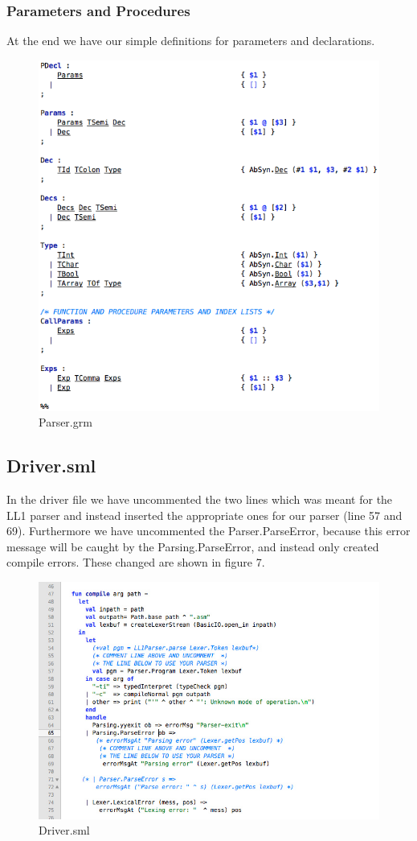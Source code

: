 \documentclass[12pt,a4paper,english]{article}
\begin{document}
\subsubsection{Parameters and Procedures}
At the end we have our simple definitions for parameters and declarations.
\begin{figure}[h]\includegraphics[width=15cm]{params.png}\caption{Parser.grm}\end{figure}

\newpage
\subsection{Driver.sml}
In the driver file we have uncommented the two lines which was meant for the LL1 parser and instead inserted the appropriate ones for our parser (line 57 and 69). Furthermore we have uncommented the Parser.ParseError, because this error message will be caught by the Parsing.ParseError, and instead only created compile errors. These changed are shown in figure 7.
\begin{figure}[h]\includegraphics[width=15cm]{driver.jpg}\caption{Driver.sml}\end{figure}
\end{document}
